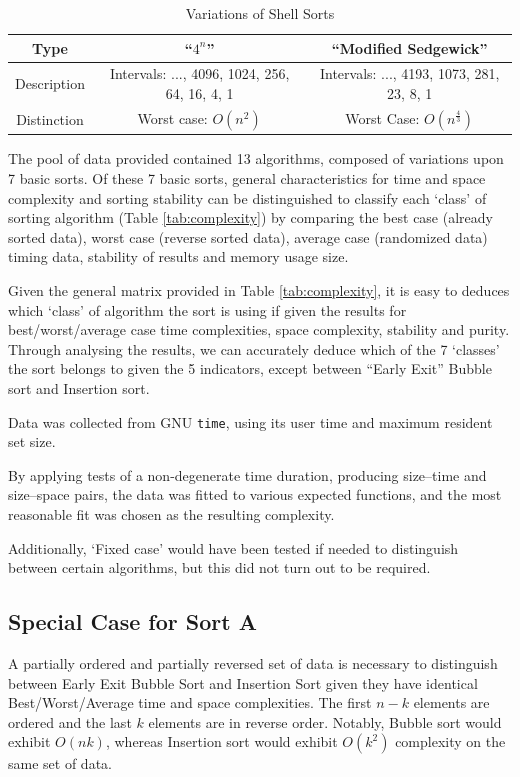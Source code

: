 \documentclass[a4paper]{scrartcl}
\begin{document}
\begin{table}
    \centering
    \begin{tabulary}{\linewidth}{c | C | C}
        Type & ``\(4^n\)'' & ``Modified Sedgewick'' \\
        \hline
        Description & Intervals: ..., 4096, 1024, 256, 64, 16, 4, 1 & Intervals: ..., 4193, 1073, 281, 23, 8, 1 \\
        \hline
        Distinction & Worst case: \(O(n^2)\) & Worst Case: \(O(n^{\frac{4}{3}})\)
    \end{tabulary}
    \caption{Variations of Shell Sorts}
    \label{tab:shell_sort}
\end{table}

The pool of data provided contained 13 algorithms, composed of variations upon 7 basic sorts. Of these 7 basic sorts, general characteristics for time and space complexity and sorting stability can be distinguished to classify each `class' of sorting algorithm (Table \ref{tab:complexity}) by comparing the best case (already sorted data), worst case (reverse sorted data), average case (randomized data) timing data, stability of results and memory usage size.

Given the general matrix provided in Table \ref{tab:complexity}, it is easy to deduces which `class' of algorithm the sort is using if given the results for best/worst/average case time complexities, space complexity, stability and purity. Through analysing the results, we can accurately deduce which of the 7 `classes' the sort belongs to given the 5 indicators, except between ``Early Exit'' Bubble sort and Insertion sort.

Data was collected from GNU \texttt{time}, using its user time and maximum resident set size.

By applying tests of a non-degenerate time duration, producing size--time and size--space pairs, the data was fitted to various expected functions, and the most reasonable fit was chosen as the resulting complexity.

Additionally, `Fixed case' would have been tested if needed to distinguish between certain algorithms, but this did not turn out to be required.

\subsection{Special Case for Sort A}
A partially ordered and partially reversed set of data is necessary to distinguish between Early Exit Bubble Sort and Insertion Sort given they have identical Best/Worst/Average time and space complexities. The first \(n - k\) elements are ordered and the last \(k\) elements are in reverse order. Notably, Bubble sort would exhibit \(O(n k)\), whereas Insertion sort would exhibit \(O(k^2)\) complexity on the same set of data.
\end{document}
